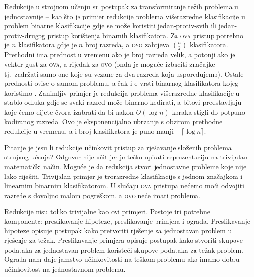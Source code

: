Redukcije u strojnom učenju su postupak za transformiranje težih problema u
jednostavnije -- kao što je primjer redukcije problema višerazredne
klasifikacije u problem binarne klasifikacije gdje se može koristiti
jedan-protiv-svih  ili
jedan-protiv-drugog  pristup
korištenja binarnih klasifikatora. Za \textsc{ova} pristup potrebno je $n$
klasifikatora gdje je $n$ broj razreda, a \textsc{ovo} zahtjeva $\binom{n}{2}$
klasifikatora. Prethodni ima prednost u vremenu ako je broj razreda velik, a
potonji ako je vektor gust za \textsc{ova}, a rijedak za \textsc{ovo} (onda je
moguće izbaciti značajke tj.~zadržati samo one koje su vezane za dva razreda
koja uspoređujemo). Ostale prednosti ovise o samom problemu, a čak i o vrsti
binarnog klasifikatora kojeg koristimo \citep{milgram2006one}. Zanimljiv primjer
je redukcija problema višerazredne klasifikacije u stablo odluka  gdje se svaki razred može binarno kodirati, a bitovi predstavljaju koje
ćemo dijete čvora izabrati da bi nakon $O(\log n)$ koraka stigli do potpuno
kodiranog razreda. Ovo je eksponencijalno ubrzanje s obzirom prethodne redukcije
u vremenu, a i broj klasifikatora je puno manji -- $\lceil \log n \rceil$.

Pitanje je jesu li redukcije učinkovit pristup za rješavanje složenih problema
strojnog učenja? Odgovor nije očit jer je teško opisati reprezentaciju na
trivijalan matematički način. Moguće je da redukcija stvori jednostavne probleme
koje nije lako riješiti. Trivijalan primjer je trorazredne klasifikacije s
jednom značajkom i linearnim binarnim klasifikatorom. U slučaju \textsc{ova}
pristupa nećemo moći odvojiti razrede s dovoljno malom pogreškom, a \textsc{ovo}
neće imati problema.

Redukcije nisu toliko trivijalne kao ovi primjeri. Postoje tri potrebne
komponente: preslikavanje hipoteze, preslikavanje primjera i ograda.
Preslikavanje hipoteze opisuje postupak kako pretvoriti rješenje za jednostavan
problem u rješenje za težak. Preslikavanje primjera opisuje postupak kako
stvoriti skupove podataka za jednostavan problem koristeći skupove podataka za
težak problem. Ograda nam daje jamstvo učinkovitosti na teškom problemu ako
imamo dobru učinkovitost na jednostavnom problemu.

